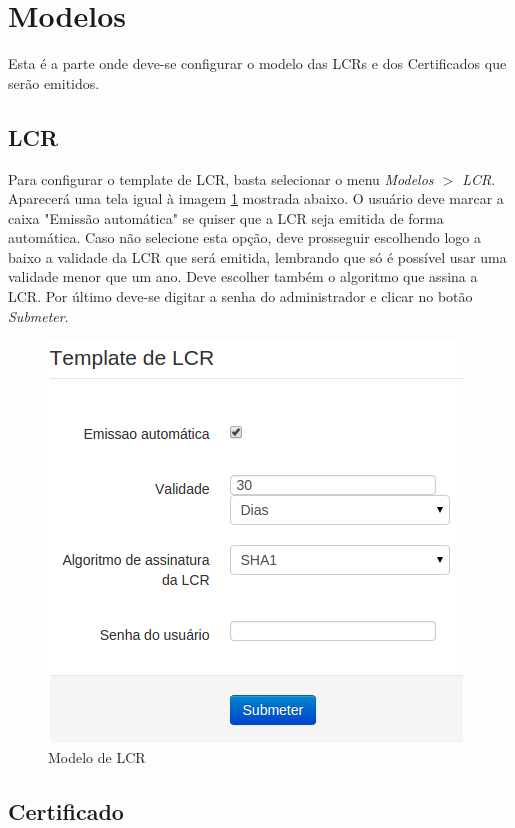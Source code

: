 \section{Modelos}

Esta é a parte onde deve-se configurar o modelo das LCRs e dos Certificados que serão emitidos.

\subsection{LCR}

Para configurar o template de LCR, basta selecionar o menu \textit{Modelos $>$ LCR}. Aparecerá uma tela igual à imagem \ref{fig:modelolcr} mostrada abaixo. O usuário deve marcar a caixa "Emissão automática" se quiser que a LCR seja emitida de forma automática. Caso não selecione esta opção, deve prosseguir escolhendo logo a baixo a validade da LCR que será emitida, lembrando que só é possível usar uma validade menor que um ano. Deve escolher também o algoritmo que assina a LCR.
Por último deve-se digitar a senha do administrador e clicar no botão \emph{Submeter}.

\begin{figure}[ht]
     \centering
     \includegraphics[scale=0.5]{images/modelolcr.png}
     \caption{Modelo de LCR}
     \label{fig:modelolcr}
\end{figure}

\subsection{Certificado}

